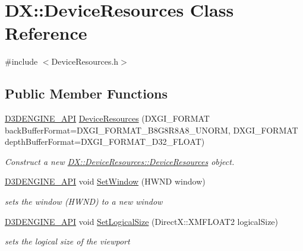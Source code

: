 \hypertarget{class_d_x_1_1_device_resources}{}\section{DX\+:\+:Device\+Resources Class Reference}
\label{class_d_x_1_1_device_resources}


{\ttfamily \#include $<$Device\+Resources.\+h$>$}

\subsection*{Public Member Functions}
\begin{DoxyCompactItemize}
\item 
\mbox{\hyperlink{stdafx_8h_a8ee2d990c5dfba7794dd2b60741d7722}{D3\+D\+E\+N\+G\+I\+N\+E\+\_\+\+A\+PI}} \mbox{\hyperlink{class_d_x_1_1_device_resources_a78141267b73a601408bf12f5090b25ca}{Device\+Resources}} (D\+X\+G\+I\+\_\+\+F\+O\+R\+M\+AT back\+Buffer\+Format=D\+X\+G\+I\+\_\+\+F\+O\+R\+M\+A\+T\+\_\+\+B8\+G8\+R8\+A8\+\_\+\+U\+N\+O\+RM, D\+X\+G\+I\+\_\+\+F\+O\+R\+M\+AT depth\+Buffer\+Format=D\+X\+G\+I\+\_\+\+F\+O\+R\+M\+A\+T\+\_\+\+D32\+\_\+\+F\+L\+O\+AT)
\begin{DoxyCompactList}\small\item\em Construct a new \mbox{\hyperlink{class_d_x_1_1_device_resources_a78141267b73a601408bf12f5090b25ca}{D\+X\+::\+Device\+Resources\+::\+Device\+Resources}} object. \end{DoxyCompactList}\item 
\mbox{\hyperlink{stdafx_8h_a8ee2d990c5dfba7794dd2b60741d7722}{D3\+D\+E\+N\+G\+I\+N\+E\+\_\+\+A\+PI}} void \mbox{\hyperlink{class_d_x_1_1_device_resources_a76181b89d31d8aef4c8397fcee2c3d61}{Set\+Window}} (H\+W\+ND window)
\begin{DoxyCompactList}\small\item\em sets the window (H\+W\+ND) to a new window \end{DoxyCompactList}\item 
\mbox{\hyperlink{stdafx_8h_a8ee2d990c5dfba7794dd2b60741d7722}{D3\+D\+E\+N\+G\+I\+N\+E\+\_\+\+A\+PI}} void \mbox{\hyperlink{class_d_x_1_1_device_resources_a5a0453913627052d011544e4cff2f3e6}{Set\+Logical\+Size}} (Direct\+X\+::\+X\+M\+F\+L\+O\+A\+T2 logical\+Size)
\begin{DoxyCompactList}\small\item\em sets the logical size of the viewport \end{DoxyCompactList}\item 

\end{DoxyCompactItemize}
